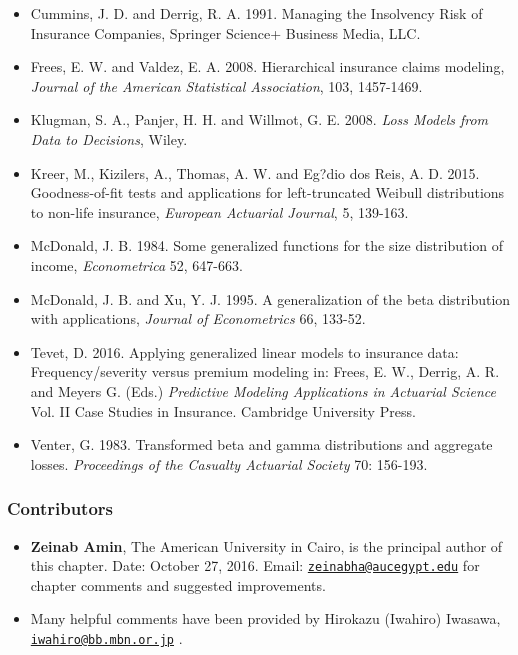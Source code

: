 \documentclass[]{book}
\theoremstyle{definition}
\theoremstyle{definition}
\theoremstyle{definition}
\theoremstyle{remark}
\begin{document}
\begin{itemize}
\item
  Cummins, J. D. and Derrig, R. A. 1991. Managing the Insolvency Risk of
  Insurance Companies, Springer Science+ Business Media, LLC.
\item
  Frees, E. W. and Valdez, E. A. 2008. Hierarchical insurance claims
  modeling, \emph{Journal of the American Statistical Association}, 103,
  1457-1469.
\item
  Klugman, S. A., Panjer, H. H. and Willmot, G. E. 2008. \emph{Loss
  Models from Data to Decisions}, Wiley.
\item
  Kreer, M., Kizilers, A., Thomas, A. W. and Eg?dio dos Reis, A. D.
  2015. Goodness-of-fit tests and applications for left-truncated
  Weibull distributions to non-life insurance, \emph{European Actuarial
  Journal}, 5, 139-163.
\item
  McDonald, J. B. 1984. Some generalized functions for the size
  distribution of income, \emph{Econometrica} 52, 647-663.
\item
  McDonald, J. B. and Xu, Y. J. 1995. A generalization of the beta
  distribution with applications, \emph{Journal of Econometrics} 66,
  133-52.
\item
  Tevet, D. 2016. Applying generalized linear models to insurance data:
  Frequency/severity versus premium modeling in: Frees, E. W., Derrig,
  A. R. and Meyers G. (Eds.) \emph{Predictive Modeling Applications in
  Actuarial Science} Vol. II Case Studies in Insurance. Cambridge
  University Press.
\item
  Venter, G. 1983. Transformed beta and gamma distributions and
  aggregate losses. \emph{Proceedings of the Casualty Actuarial Society}
  70: 156-193.
\end{itemize}

\subsubsection*{Contributors}\label{contributors}

\begin{itemize}
\item
  \textbf{Zeinab Amin}, The American University in Cairo, is the
  principal author of this chapter. Date: October 27, 2016. Email:
  \href{mailto:zeinabha@aucegypt.edu}{\nolinkurl{zeinabha@aucegypt.edu}}
  for chapter comments and suggested improvements.
\item
  Many helpful comments have been provided by Hirokazu (Iwahiro)
  Iwasawa,
  \href{mailto:iwahiro@bb.mbn.or.jp}{\nolinkurl{iwahiro@bb.mbn.or.jp}} .
\end{itemize}
\end{document}
